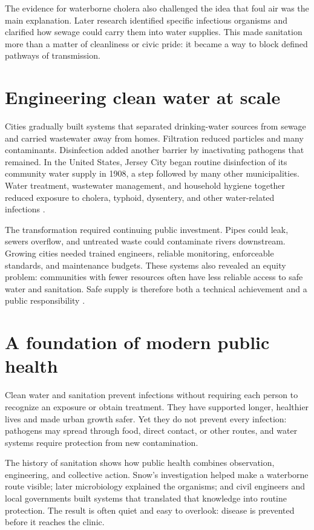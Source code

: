 \documentclass[12pt,oneside]{book}
\begin{document}
The evidence for waterborne cholera also challenged the idea that foul air
was the main explanation. Later research identified specific infectious
organisms and clarified how sewage could carry them into water supplies.
This made sanitation more than a matter of cleanliness or civic pride: it
became a way to block defined pathways of transmission.

\section{Engineering clean water at scale}
Cities gradually built systems that separated drinking-water sources from
sewage and carried wastewater away from homes. Filtration reduced particles
and many contaminants. Disinfection added another barrier by inactivating
pathogens that remained. In the United States, Jersey City began routine
disinfection of its community water supply in 1908, a step followed by many
other municipalities. Water treatment, wastewater management, and household
hygiene together reduced exposure to cholera, typhoid, dysentery, and other
water-related infections \cite{epaWaterHistory,whoDrinkingWater}.

The transformation required continuing public investment. Pipes could leak,
sewers overflow, and untreated waste could contaminate rivers downstream.
Growing cities needed trained engineers, reliable monitoring, enforceable
standards, and maintenance budgets. These systems also revealed an equity
problem: communities with fewer resources often have less reliable access to
safe water and sanitation. Safe supply is therefore both a technical
achievement and a public responsibility \cite{whoDrinkingWater}.

\section{A foundation of modern public health}
Clean water and sanitation prevent infections without requiring each person
to recognize an exposure or obtain treatment. They have supported longer,
healthier lives and made urban growth safer. Yet they do not prevent every
infection: pathogens may spread through food, direct contact, or other
routes, and water systems require protection from new contamination.

The history of sanitation shows how public health combines observation,
engineering, and collective action. Snow's investigation helped make a
waterborne route visible; later microbiology explained the organisms; and
civil engineers and local governments built systems that translated that
knowledge into routine protection. The result is often quiet and easy to
overlook: disease is prevented before it reaches the clinic.
\end{document}
